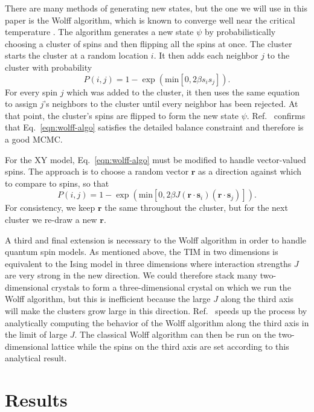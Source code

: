 \documentclass[amsmath,amssymb,aps,twocolumn,nofootinbib]{revtex4-2}
\newcommand{\parens}[1]{\left ( #1 \right )}
\begin{document}
There are many methods of generating new states, but the one we will use in this paper is the Wolff algorithm, which is known to converge well near the critical temperature \cite{wolff1989collective}. The algorithm generates a new state $\psi$ by probabilistically choosing a cluster of spins and then flipping all the spins at once. The cluster starts the cluster at a random location $i$. It then adds each neighbor $j$ to the cluster with probability
\begin{equation}
  P(i,j) = 1 - \exp\parens{\mathrm{min}\left[0, 2\beta s_i s_j \right]}.
  \label{eqn:wolff-algo}
\end{equation}
For every spin $j$ which was added to the cluster, it then uses the same equation to assign $j$'s neighbors to the cluster until every neighbor has been rejected. At that point, the cluster's spins are flipped to form the new state $\psi$. Ref.~\cite{wolff1989collective} confirms that Eq.~\ref{eqn:wolff-algo} satisfies the detailed balance constraint and therefore is a good MCMC.

For the XY model, Eq.~\ref{eqn:wolff-algo} must be modified to handle vector-valued spins. The approach is to choose a random vector $\bm r$ as a direction against which to compare to spins, so that
\begin{equation}
  P(i,j) = 1 - \exp\parens{\mathrm{min}\left[0, 2\beta J (\bm r \cdot \bm s_i)(\bm r \cdot \bm s_j) \right]}.
\end{equation}
For consistency, we keep $\bm r$ the same throughout the cluster, but for the next cluster we re-draw a new $\bm r$.

A third and final extension is necessary to the Wolff algorithm in order to handle quantum spin models. As mentioned above, the TIM in two dimensions is equivalent to the Ising model in three dimensions where interaction strengths $J$ are very strong in the new direction. We could therefore stack many two-dimensional crystals to form a three-dimensional crystal on which we run the Wolff algorithm, but this is inefficient because the large $J$ along the third axis will make the clusters grow large in this direction. Ref.~\cite{blote2002cluster} speeds up the process by analytically computing the behavior of the Wolff algorithm along the third axis in the limit of large $J$. The classical Wolff algorithm can then be run on the two-dimensional lattice while the spins on the third axis are set according to this analytical result.

\section{Results}
\end{document}
